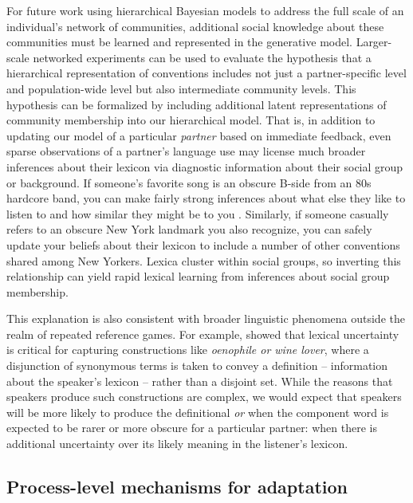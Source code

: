 For future work using hierarchical Bayesian models to address the full scale of an individual's  network of communities, additional social knowledge about these communities must be learned and represented in the generative model.
Larger-scale networked experiments can be used to evaluate the hypothesis that a hierarchical representation of conventions includes not just a partner-specific level and population-wide level but also intermediate community levels. 
This hypothesis can be formalized by including additional latent representations of community membership into our hierarchical model.
That is, in addition to updating our model of a particular \emph{partner} based on immediate feedback, even sparse observations of a partner's language use may license much broader inferences about their lexicon via diagnostic information about their social group or background. 
If someone's favorite song is an obscure B-side from an 80s hardcore band, you can make fairly strong inferences about what else they like to listen to and how similar they might be to you \cite{VelezEtAl16_Overlaps, GershmanEtAl17_StructureSocialInfluence}. 
Similarly, if someone casually refers to an obscure New York landmark you also recognize, you can safely update your beliefs about their lexicon to include a number of other conventions shared among New Yorkers. 
Lexica cluster within social groups, so inverting this relationship can yield rapid lexical learning from inferences about social group membership.

This explanation is also consistent with broader linguistic phenomena outside the realm of repeated reference games. 
For example,  showed that lexical uncertainty is critical for capturing constructions like \emph{oenophile or wine lover}, where a disjunction of synonymous terms is taken to convey a definition -- information about the speaker's lexicon -- rather than a disjoint set. 
While the reasons that speakers produce such constructions are complex, we would expect that speakers will be more likely to produce the definitional \emph{or} when the component word is expected to be rarer or more obscure for a particular partner: when there is additional uncertainty over its likely meaning in the listener's lexicon.


\subsection{Process-level mechanisms for adaptation}

